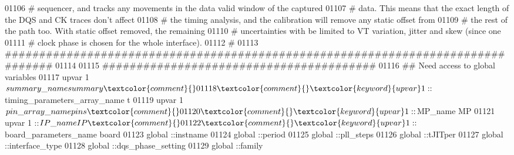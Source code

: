 \begin{DoxyCode}
01106 \textcolor{comment}{}\textcolor{comment}{   }\textcolor{comment}{# sequencer, and tracks any movements in the data valid window of the captured}
01107 \textcolor{comment}{}\textcolor{comment}{   }\textcolor{comment}{# data. This means that the exact length of the DQS and CK traces don't affect}
01108 \textcolor{comment}{}\textcolor{comment}{   }\textcolor{comment}{# the timing analysis, and the calibration will remove any static offset from}
01109 \textcolor{comment}{}\textcolor{comment}{   }\textcolor{comment}{# the rest of the path too. With static offset removed, the remaining}
01110 \textcolor{comment}{}\textcolor{comment}{   }\textcolor{comment}{# uncertainties with be limited to VT variation, jitter and skew (since one}
01111 \textcolor{comment}{}\textcolor{comment}{   }\textcolor{comment}{# clock phase is chosen for the whole interface).}
01112 \textcolor{comment}{}\textcolor{comment}{   }\textcolor{comment}{# }
01113 \textcolor{comment}{}\textcolor{comment}{   }\textcolor{comment}{################################################################################}
01114 \textcolor{comment}{}\textcolor{comment}{   }
01115    \textcolor{comment}{########################################}
01116 \textcolor{comment}{}\textcolor{comment}{   }\textcolor{comment}{## Need access to global variables}
01117 \textcolor{comment}{}\textcolor{comment}{   }\textcolor{keyword}{upvar} 1 $summary\_name summary\textcolor{comment}{}
01118 \textcolor{comment}{}   \textcolor{keyword}{upvar} 1 ::$timing\_parameters\_array\_name t\textcolor{comment}{}
01119 \textcolor{comment}{}   \textcolor{keyword}{upvar} 1 $pin\_array\_name pins\textcolor{comment}{}
01120 \textcolor{comment}{}   \textcolor{keyword}{upvar} 1 ::$MP\_name MP\textcolor{comment}{}
01121 \textcolor{comment}{}   \textcolor{keyword}{upvar} 1 ::$IP\_name IP\textcolor{comment}{}
01122 \textcolor{comment}{}   \textcolor{keyword}{upvar} 1 ::$board\_parameters\_name board\textcolor{comment}{      }
01123 \textcolor{comment}{}   \textcolor{keyword}{global} ::instname\textcolor{comment}{   }
01124 \textcolor{comment}{}   \textcolor{keyword}{global} ::period\textcolor{comment}{}
01125 \textcolor{comment}{}   \textcolor{keyword}{global} ::pll\_steps\textcolor{comment}{}
01126 \textcolor{comment}{}   \textcolor{keyword}{global} ::tJITper\textcolor{comment}{}
01127 \textcolor{comment}{}   \textcolor{keyword}{global} ::interface\_type\textcolor{comment}{}
01128 \textcolor{comment}{}   \textcolor{keyword}{global} ::dqs\_phase\_setting\textcolor{comment}{}
01129 \textcolor{comment}{}   \textcolor{keyword}{global} ::family\textcolor{comment}{}

\end{DoxyCode}

